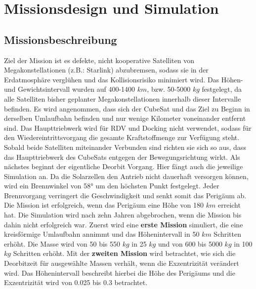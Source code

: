 \chapter{Missionsdesign und Simulation}


\section{Missionsbeschreibung}

	Ziel der Mission ist es defekte, nicht kooperative Satelliten von Megakonstellationen (z.B.: Starlink) abzubremsen, sodass sie in der Erdatmosphäre verglühen und das Kollisionsrisiko minimiert wird. Das Höhen- und Gewichtsintervall wurden auf 400-1400 $km$, bzw. 50-5000 $kg$ festgelegt, da alle Satelliten bisher geplanter Megakonstellationen innerhalb dieser Intervalle befinden.
Es wird angenommen, dass sich der CubeSat und das Ziel zu Beginn in derselben Umlaufbahn befinden und nur wenige Kilometer voneinander entfernt sind. Das Haupttriebwerk wird für RDV und Docking nicht verwendet, sodass für den Wiedereintrittsvorgang die gesamte Kraftstoffmenge zur Verfügung steht. Sobald beide Satelliten miteinander Verbunden sind richten sie sich so aus, dass das Haupttriebwerk des CubeSats entgegen der Bewegungsrichtung wirkt. Als nächstes beginnt der eigentliche Deorbit Vorgang. Hier fängt auch die jeweilige Simulation an. Da die Solarzellen den Antrieb nicht dauerhaft versorgen können, wird ein Brennwinkel von 58° um den höchsten Punkt festgelegt. Jeder Brennvorgang verringert die Geschwindigkeit und senkt somit das Perigäum ab. Die Mission ist erfolgreich, wenn das Perigäum eine Höhe von 180 $km$ erreicht hat. Die Simulation wird nach zehn Jahren abgebrochen, wenn die Mission bis dahin nicht erfolgreich war. 
Zuerst wird eine \textbf{erste Mission} simuliert, die eine kreisförmige Umlaufbahn annimmt und das Höhenintervall in 50 $km$ Schritten erhöht. Die Masse wird von 50 bis 550 $kg$ in 25 $kg$ und von 600 bis 5000 $kg$ in 100 $kg$ Schritten erhöht.
Mit der \textbf{zweiten Mission} wird betrachtet, wie sich die Deorbitzeit für ausgewählte Massen verhält, wenn die Exzentrizität verändert wird. Das Höhenintervall beschreibt hierbei die Höhe des Perigäums und die Exzentrizität wird von 0.025 bis 0.3 betrachtet.
	
